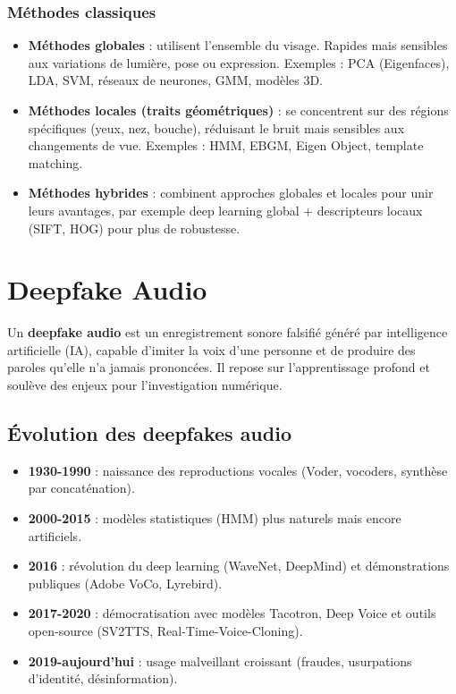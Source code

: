 \documentclass[12pt]{article}
\begin{document}
\begin{center}
\subsubsection*{Méthodes classiques}
\begin{itemize}[leftmargin=*, label=\textbullet]
    \item \textbf{Méthodes globales} : utilisent l'ensemble du visage. Rapides mais sensibles aux variations de lumière, pose ou expression. Exemples : PCA (Eigenfaces), LDA, SVM, réseaux de neurones, GMM, modèles 3D.
    \item \textbf{Méthodes locales (traits géométriques)} : se concentrent sur des régions spécifiques (yeux, nez, bouche), réduisant le bruit mais sensibles aux changements de vue. Exemples : HMM, EBGM, Eigen Object, template matching.
    \item \textbf{Méthodes hybrides} : combinent approches globales et locales pour unir leurs avantages, par exemple deep learning global + descripteurs locaux (SIFT, HOG) pour plus de robustesse.
\end{itemize} 

\section{Deepfake Audio}

Un \textbf{deepfake audio} est un enregistrement sonore falsifié généré par intelligence artificielle (IA), capable d'imiter la voix d'une personne et de produire des paroles qu'elle n'a jamais prononcées. Il repose sur l'apprentissage profond et soulève des enjeux pour l'investigation numérique.

\subsection{Évolution des deepfakes audio}
\begin{itemize}[leftmargin=*, label=\textbullet]
    \item \textbf{1930-1990} : naissance des reproductions vocales (Voder, vocoders, synthèse par concaténation).
    \item \textbf{2000-2015} : modèles statistiques (HMM) plus naturels mais encore artificiels.
    \item \textbf{2016} : révolution du deep learning (WaveNet, DeepMind) et démonstrations publiques (Adobe VoCo, Lyrebird).
    \item \textbf{2017-2020} : démocratisation avec modèles Tacotron, Deep Voice et outils open-source (SV2TTS, Real-Time-Voice-Cloning).
    \item \textbf{2019-aujourd'hui} : usage malveillant croissant (fraudes, usurpations d'identité, désinformation).
\end{itemize}


\end{center}
\end{document}
